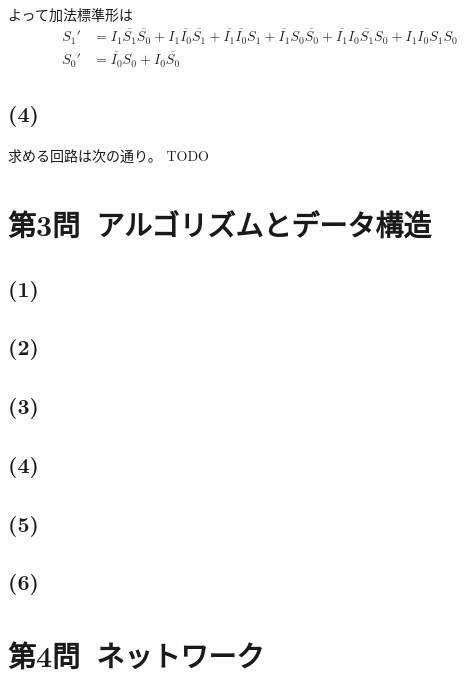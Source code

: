 \documentclass[a4paper,12pt,xelatex,ja=standard]{bxjsarticle}
\begin{document}
よって加法標準形は
\begin{equation*}
  \begin{split}
    S_1'
      &= I_1 \overline{S_1} \overline{S_0} + I_1 \overline{I_0} \overline{S_1} + \overline{I_1} \overline{I_0} S_1 + \overline{I_1} S_0 \overline{S_0} + \overline{I_1}I_0 \overline{S_1}S_0 + I_1 I_0 S_1 S_0 \\
    S_0'
      &= \overline{I_0}S_0 + I_0 \overline{S_0}
  \end{split}
\end{equation*}

\subsection*{(4)}
求める回路は次の通り。
TODO

\section*{第3問\ アルゴリズムとデータ構造}
\subsection*{(1)}

\subsection*{(2)}

\subsection*{(3)}

\subsection*{(4)}

\subsection*{(5)}

\subsection*{(6)}

\section*{第4問\ ネットワーク}
\end{document}
